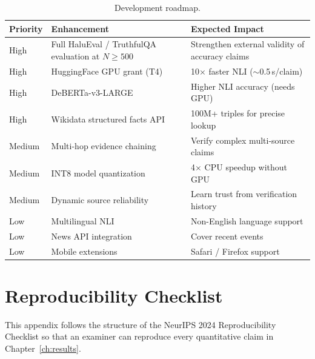 \documentclass[12pt, a4paper, oneside]{report}
\begin{document}
\begin{table}[H]
\centering
\caption{Development roadmap.}
\label{tab:roadmap}
\begin{tabularx}{\textwidth}{l l X}
\toprule
\textbf{Priority} & \textbf{Enhancement} & \textbf{Expected Impact} \\
\midrule
High & Full HaluEval / TruthfulQA evaluation at $N\geq500$ & Strengthen external validity of accuracy claims \\
High & HuggingFace GPU grant (T4) & 10$\times$ faster NLI ($\sim$0.5\,s/claim) \\
High & DeBERTa-v3-LARGE & Higher NLI accuracy (needs GPU) \\
High & Wikidata structured facts API & 100M+ triples for precise lookup \\
Medium & Multi-hop evidence chaining & Verify complex multi-source claims \\
Medium & INT8 model quantization & 4$\times$ CPU speedup without GPU \\
Medium & Dynamic source reliability & Learn trust from verification history \\
Low & Multilingual NLI & Non-English language support \\
Low & News API integration & Cover recent events \\
Low & Mobile extensions & Safari / Firefox support \\
\bottomrule
\end{tabularx}
\end{table}

\appendix

\chapter{Reproducibility Checklist}
\label{app:repro}

This appendix follows the structure of the NeurIPS 2024 Reproducibility Checklist so that an examiner can reproduce every quantitative claim in Chapter~\ref{ch:results}.
\end{document}

